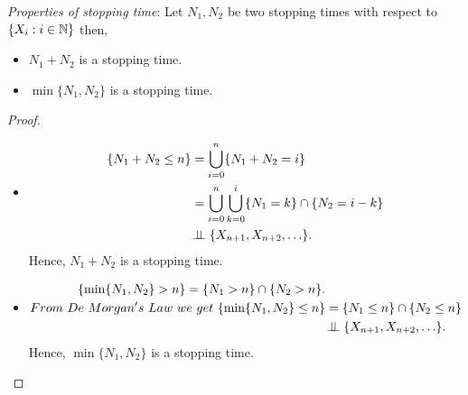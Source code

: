 \documentclass[a4paper,10pt, english]{article}
\begin{document}
\emph{Properties of stopping time}: Let $N_1,N_2$ be two stopping times with respect to $\{X_i : i \in \mathbb{N} \} $ then,
\begin{itemize}
	\item $N_1+N_2$ is a stopping time.
	\item $\min \{N_1,N_2\} $ is a stopping time.
\end{itemize}
\begin{proof}
\begin{itemize}
	\item 
	\begin{align*}
	\{N_1+N_2 \leq n\} &= \bigcup_{i=0}^{n} \{N_1+N_2 = i\}
	\\
	&= \bigcup_{i=0}^{n} \bigcup_{k=0}^{i} \{N_1 = k\} \cap \{N_2 = i-k\}
	\\
	& \!\perp\!\!\!\perp \{X_{n+1},X_{n+2},\ldots\}.
	\end{align*}
	Hence, $N_1+N_2$ is a stopping time.
	\item 
	\begin{align*}
	\{\min \{N_1,N_2\} > n\} = \{N_1 > n\} \cap \{N_2 > n\}.
	\\
	From ~De ~Morgan's ~Law ~we ~get ~\{\min \{N_1,N_2\} \leq n\} &= \{N_1 \leq n\} \cap \{N_2 \leq n\}
	\\
	& \!\perp\!\!\!\perp \{X_{n+1},X_{n+2},\ldots\}.
	\end{align*}
	Hence, $\min \{N_1,N_2\} $ is a stopping time.
\end{itemize}
\end{proof}
\end{document}
